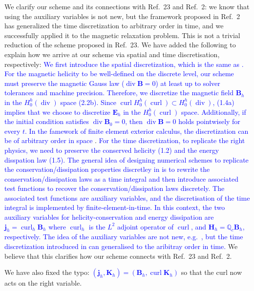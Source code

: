 \documentclass{article}
\theoremstyle{definition}
\renewcommand\div{\operatorname{div}}
\newcommand\curl{\operatorname{curl}}
\newcommand{\blue}[1]{\textcolor{blue}{#1}}
\begin{document}
\begin{enumerate}
\begin{enumerate}
    \end{enumerate}
    We clarify our scheme and its connections with Ref.\ 23 and Ref.\ 2: we know that using the auxiliary variables is not new, but the framework proposed in Ref.\ 2 has generalized the time discretization to arbitrary order in time, and we successfully applied it to the magnetic relaxation problem. This is not a trivial reduction of the scheme proposed in Ref.\ 23.  We have added the following to explain how we arrive at our scheme via spatial and time discretisation, respectively: \blue{
We first introduce the spatial discretization, which is the same as \cite{huHelicityconservativeFiniteElement2021}. For the magnetic helicity to be well-defined on the discrete level, our scheme must preserve the magnetic Gauss law ($\div \bm B=0$) at least up to solver tolerances and machine precision. Therefore, we discretize the magnetic field $\bm B_h$ in the $H_0^h(\div)$ space (2.2b).} \blue{Since $\curl H_0^h(\curl)\subset H_0^h(\div)$, (1.4a) implies that we choose to discretize $\bm E_h$ in the $H_0^h(\curl)$ space. Additionally, if the initial condition satisfies $\div \bm B_0=0$, then $\div \bm B=0$ holds pointwisely for every $t$. In the famework of finite element exterior calculus, the discretization can be of arbitrary order in space \cite{arnoldFiniteElementExterior2006}}. 
\blue{For the time discretization, to replicate the right physics, we need to preserve the conserved helicity (1.2) and the energy disspation law (1.5). The general idea of designing numerical schemes to replicate the conservation/dissipation properties discretley in \cite{andrews2024enforcing} is to rewrite the conservation/dissipation laws as a time integral and then introduce associated test functions to recover the conservation/dissipation laws discretely. The associated test functions are auxiliary variables, and the discretisation of the time integral is implemented by finite-element-in-time. In this context, the two auxiliary variables for helicity-conservation and energy dissipation are $\bm j_h =\curl_h\bm B_h$ where $\curl_h$ is the $L^2$ adjoint operator of $\curl$, and $\bm H_h = \mathbb{Q}_c\bm B_h$, respectively. The idea of the auxiliary variables are not new, e.g.~\cite{huHelicityconservativeFiniteElement2021,LaakmannStructurepreservinghelicityconservingfinite2023}, but the time discretization introduced in \cite{andrews2024enforcing} can generalised to the aribitray order in time. } We believe that this clarifies how our scheme connects with Ref.\ 23 and Ref.\ 2. 

We have also fixed the typo: \blue{$(\bm{j}_h, \bm{K}_h) = (\bm{B}_h, \curl\bm{K}_h)$} so that the curl now acts on the right variable.


\end{enumerate}
\end{document}
